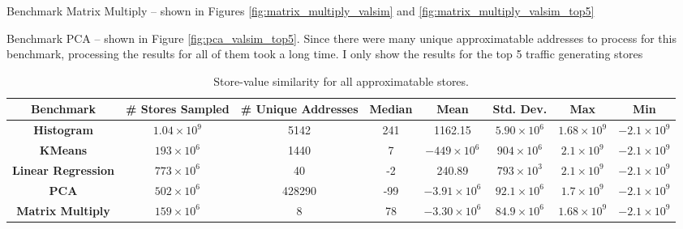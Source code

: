 Benchmark Matrix Multiply -- shown in Figures \ref{fig:matrix_multiply_valsim} and \ref{fig:matrix_multiply_valsim_top5}

Benchmark PCA -- shown in Figure \ref{fig:pca_valsim_top5}. Since there were many unique approximatable addresses to process for this benchmark, processing the results for all of them took a long time. I only show the results for the top 5 traffic generating stores


\begin{table}[htbp]
\caption{Store-value similarity for all approximatable stores.}
	\begin{center}
		\begin{tabular}{|c|c|c|c|c|c|c|c|}
			\hline
			\textbf{Benchmark} & \textbf{\# Stores Sampled}& \textbf{\# Unique Addresses} & \textbf{Median} & \textbf{Mean} & \textbf{Std. Dev.} & \textbf{Max} & \textbf{Min} \\
			\hline

			\textbf{Histogram} & $1.04\times10^9$ & 5142 & 241 & 1162.15 & $5.90 \times 10^6$ & $1.68 \times 10^9$ & $-2.1 \times 10^9$\\
			\hline

			\textbf{KMeans} & $193\times10^6$ & 1440 & 7 & $-449 \times 10^6$ & $904 \times 10^6$ & $2.1 \times 10^9$ & $-2.1 \times 10^9$\\
			\hline

			\textbf{Linear Regression} & $773\times10^6$ & 40 & -2 & 240.89 & $793 \times 10^3$ & $2.1 \times 10^9$ & $-2.1 \times 10^9$\\
			\hline

			\textbf{PCA} & $502\times10^6$ & 428290 & -99 & $-3.91 \times 10^6$ & $92.1 \times 10^6$ & $1.7 \times 10^9$ & $-2.1 \times 10^9$\\
			\hline

			\textbf{Matrix Multiply} & $159\times10^6$ & 8 & 78 & $-3.30 \times 10^6$ & $84.9 \times 10^6$ & $1.68 \times 10^9$ & $-2.1 \times 10^9$\\
			\hline

		\end{tabular}
	\label{tab:val_sim}
	\end{center}
\end{table}

